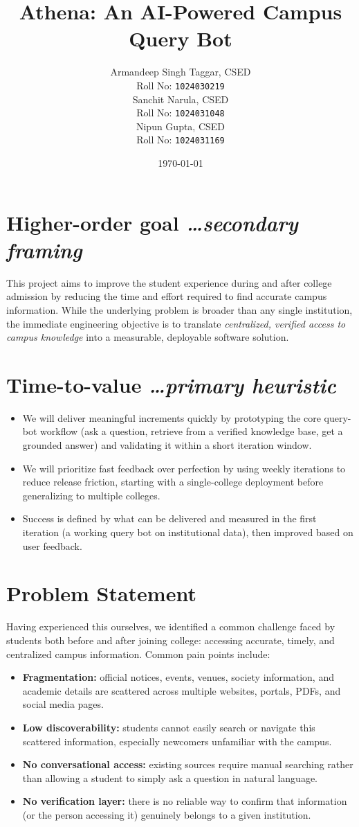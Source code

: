 \documentclass[11pt,a4paper]{article}
\title{Athena: An AI-Powered Campus Query Bot}
\author{
  Armandeep Singh Taggar, CSED \\
  \small Roll No: \texttt{1024030219}
  \\[0.5em]
  Sanchit Narula, CSED \\
  \small Roll No: \texttt{1024031048}
  \\[0.5em]
  Nipun Gupta, CSED \\
  \small Roll No: \texttt{1024031169}
}
\date{\today}
\newcommand{\BvrHint}[1]{%
  {\normalfont\normalsize\itshape\hfill #1}}
\begin{document}
\maketitle

\section{Higher-order goal%
  \BvrHint{\ldots secondary framing}}
This project aims to improve the student experience during and after
college admission by reducing the time and effort required to find
accurate campus information. While the underlying problem is broader
than any single institution, the immediate engineering objective is to
translate \emph{centralized, verified access to campus knowledge} into
a measurable, deployable software solution.

\section{Time-to-value %
\BvrHint{\ldots primary heuristic}}
\begin{itemize}[leftmargin=0.7cm]
    \item We will deliver meaningful increments quickly by prototyping the core query-bot workflow (ask a question, retrieve from a verified knowledge base, get a grounded answer) and validating it within a short iteration window.
    \item We will prioritize fast feedback over perfection by using weekly iterations to reduce release friction, starting with a single-college deployment before generalizing to multiple colleges.
    \item Success is defined by what can be delivered and measured in the first iteration (a working query bot on institutional data), then improved based on user feedback.
\end{itemize}

\section{Problem Statement}
Having experienced this ourselves, we identified a common challenge
faced by students both before and after joining college: accessing
accurate, timely, and centralized campus information. Common pain
points include:
\begin{itemize}[leftmargin=0.7cm]
    \item \textbf{Fragmentation:} official notices, events, venues, society information, and academic details are scattered across multiple websites, portals, PDFs, and social media pages.
    \item \textbf{Low discoverability:} students cannot easily search or navigate this scattered information, especially newcomers unfamiliar with the campus.
    \item \textbf{No conversational access:} existing sources require manual searching rather than allowing a student to simply ask a question in natural language.
    \item \textbf{No verification layer:} there is no reliable way to confirm that information (or the person accessing it) genuinely belongs to a given institution.
\end{itemize}
\end{document}
